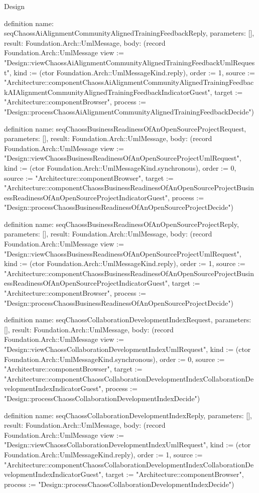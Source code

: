\begin{lexlean}{Design}
\begin{semanticmodule}
definition{
  name: seqChaossAiAlignmentCommunityAlignedTrainingFeedbackReply,
  parameters: [],
  result: Foundation.Arch::UmlMessage,
  body: (record Foundation.Arch::UmlMessage {view := "Design::viewChaossAiAlignmentCommunityAlignedTrainingFeedbackUmlRequest", kind := (ctor Foundation.Arch::UmlMessageKind.reply), order := 1, source := "Architecture::componentChaossAiAlignmentCommunityAlignedTrainingFeedbackAIAlignmentCommunityAlignedTrainingFeedbackIndicatorGuest", target := "Architecture::componentBrowser", process := "Design::processChaossAiAlignmentCommunityAlignedTrainingFeedbackDecide"})
}

definition{
  name: seqChaossBusinessReadinessOfAnOpenSourceProjectRequest,
  parameters: [],
  result: Foundation.Arch::UmlMessage,
  body: (record Foundation.Arch::UmlMessage {view := "Design::viewChaossBusinessReadinessOfAnOpenSourceProjectUmlRequest", kind := (ctor Foundation.Arch::UmlMessageKind.synchronous), order := 0, source := "Architecture::componentBrowser", target := "Architecture::componentChaossBusinessReadinessOfAnOpenSourceProjectBusinessReadinessOfAnOpenSourceProjectIndicatorGuest", process := "Design::processChaossBusinessReadinessOfAnOpenSourceProjectDecide"})
}

definition{
  name: seqChaossBusinessReadinessOfAnOpenSourceProjectReply,
  parameters: [],
  result: Foundation.Arch::UmlMessage,
  body: (record Foundation.Arch::UmlMessage {view := "Design::viewChaossBusinessReadinessOfAnOpenSourceProjectUmlRequest", kind := (ctor Foundation.Arch::UmlMessageKind.reply), order := 1, source := "Architecture::componentChaossBusinessReadinessOfAnOpenSourceProjectBusinessReadinessOfAnOpenSourceProjectIndicatorGuest", target := "Architecture::componentBrowser", process := "Design::processChaossBusinessReadinessOfAnOpenSourceProjectDecide"})
}

definition{
  name: seqChaossCollaborationDevelopmentIndexRequest,
  parameters: [],
  result: Foundation.Arch::UmlMessage,
  body: (record Foundation.Arch::UmlMessage {view := "Design::viewChaossCollaborationDevelopmentIndexUmlRequest", kind := (ctor Foundation.Arch::UmlMessageKind.synchronous), order := 0, source := "Architecture::componentBrowser", target := "Architecture::componentChaossCollaborationDevelopmentIndexCollaborationDevelopmentIndexIndicatorGuest", process := "Design::processChaossCollaborationDevelopmentIndexDecide"})
}

definition{
  name: seqChaossCollaborationDevelopmentIndexReply,
  parameters: [],
  result: Foundation.Arch::UmlMessage,
  body: (record Foundation.Arch::UmlMessage {view := "Design::viewChaossCollaborationDevelopmentIndexUmlRequest", kind := (ctor Foundation.Arch::UmlMessageKind.reply), order := 1, source := "Architecture::componentChaossCollaborationDevelopmentIndexCollaborationDevelopmentIndexIndicatorGuest", target := "Architecture::componentBrowser", process := "Design::processChaossCollaborationDevelopmentIndexDecide"})
}


\end{semanticmodule}
\end{lexlean}

